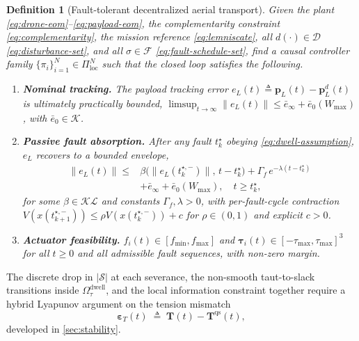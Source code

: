 \documentclass[lettersize,journal]{IEEEtran}
\newtheorem{definition}{Definition}%
\newcommand{\vect}[1]{\boldsymbol{#1}}
\begin{document}
\begin{definition}[Fault-tolerant decentralized aerial transport]
\label{def:problem}
Given the plant \eqref{eq:drone-eom}--\eqref{eq:payload-eom}, the complementarity constraint \eqref{eq:complementarity}, the mission reference \eqref{eq:lemniscate}, all $d(\cdot)\in\mathcal{D}$ \eqref{eq:disturbance-set}, and all $\sigma\in\mathcal{F}$ \eqref{eq:fault-schedule-set}, find a causal controller family $\{\pi_i\}_{i=1}^N\in\Pi_{\mathrm{loc}}^N$ such that the closed loop satisfies the following.
\begin{enumerate}[label=\textbf{P\arabic*},leftmargin=2.0em]
  \item \textbf{Nominal tracking.} The payload tracking error $e_L(t)\triangleq\vect p_L(t)-\vect p_L^d(t)$ is ultimately practically bounded,
    $\limsup_{t\to\infty}\|e_L(t)\|\le\bar e_\infty+\bar e_0(W_{\max})$, with $\bar e_0\in\mathcal{K}$.
    \label{eq:nominal-practical-bound}
  \item \textbf{Passive fault absorption.} After any fault $t_k^\star$ obeying \eqref{eq:dwell-assumption}, $e_L$ recovers to a bounded envelope,
    \begin{align}
    \label{eq:recovery-bound}
      \|e_L(t)\| \le
        &\beta\bigl(\|e_L(t_k^{\star,-})\|,\,t-t_k^\star\bigr)
         + \Gamma_f\,e^{-\lambda(t-t_k^\star)}\\
        &+ \bar e_\infty + \bar e_0(W_{\max}),\quad t\ge t_k^\star,\nonumber
    \end{align}
    for some $\beta\in\mathcal{KL}$ and constants $\Gamma_f,\lambda>0$, with per-fault-cycle contraction $V(x(t_{k+1}^{\star,-}))\le\rho V(x(t_k^{\star,-}))+c$ for $\rho\in(0,1)$ and explicit $c>0$.
  \item \textbf{Actuator feasibility.} $f_i(t)\in[f_{\min},f_{\max}]$ and $\vect\tau_i(t)\in[-\tau_{\max},\tau_{\max}]^3$ for all $t\ge 0$ and all admissible fault sequences, with non-zero margin.
\end{enumerate}
\end{definition}

The discrete drop in $|\mathcal{S}|$ at each severance, the non-smooth taut-to-slack transitions inside $\Omega_\tau^{\mathrm{dwell}}$, and the local information constraint together require a hybrid Lyapunov argument on the tension mismatch
\begin{equation}
  \vect\varepsilon_T(t) \;\triangleq\; \vect T(t) - \vect T^{\mathrm{qs}}(t),
  \label{eq:tension-error-state}
\end{equation}
developed in \cref{sec:stability}.
\end{document}
